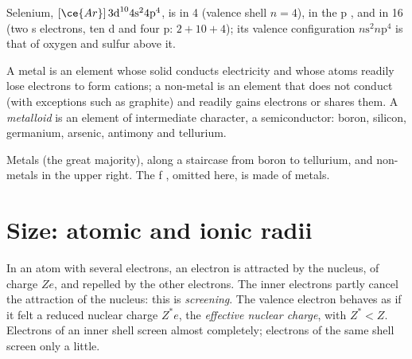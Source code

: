 \begin{example}\label{ex:b1:periodicity:position}
Selenium, $[\ce{Ar}]\,3\text{d}^{10} 4\text{s}^2 4\text{p}^4$, is in
 4 (valence shell $n = 4$), in the p , and in  16 (two s
electrons, ten d and four p: $2 + 10 + 4$); its valence configuration
$n\text{s}^2 n\text{p}^4$ is that of oxygen and sulfur above it.
\end{example}

\begin{definition}\label{def:b1:periodicity:metalloid}
A metal is an element whose solid conducts electricity and whose atoms
readily lose electrons to form cations; a non-metal is an element that
does not conduct (with exceptions such as graphite) and readily gains
electrons or shares them. A \emph{metalloid} is an
element of intermediate character, a semiconductor: boron, silicon,
germanium, arsenic, antimony and tellurium.
\end{definition}

\begin{omfigure}
\omperiodictable[colour=metals, legend, f block=false]

{\small Metals (the great majority),  along a staircase from
boron to tellurium, and non-metals in the upper right. The f ,
omitted here, is made of metals.}
\end{omfigure}

\section{Size: atomic and ionic radii}

\begin{definition}\label{def:b1:periodicity:screening}
In an atom with several electrons, an electron is attracted by the
nucleus, of charge $Ze$, and repelled by the other electrons. The inner
electrons partly cancel the attraction of the nucleus: this is
\emph{screening}. The valence electron behaves as if it
felt a reduced nuclear charge $Z^{*}e$, the \emph{effective nuclear
charge}, with $Z^{*} < Z$. Electrons of
an inner shell screen almost completely; electrons of the same shell
screen only a little.
\end{definition}

